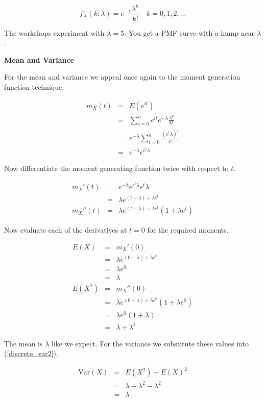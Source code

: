 \documentclass[]{article}
\begin{document}
\begin{equation} \label{poisson_pmf}
f_X(k; \lambda) = e^{-\lambda} \frac{\lambda^k}{k!} 
\quad k = 0, 1, 2, \ldots
\end{equation}

The workshops experiment with $\lambda = 5$.  You get a
PMF curve with a hump near $\lambda$.

\textbf{Mean and Variance}

For the mean and variance we appeal once again to the
moment generation function technique.

\begin{eqnarray*}
m_X(t) & = & E(e^{it}) \\
   & = & \sum_{i=0}^n e^{it} e^{-\lambda} \frac{\lambda^k}{k!} \\
   & = & e^{-\lambda} \sum_{i=0}^n \frac{(e^t \lambda)^i}{i!} \\
   & = & e^{-\lambda} e^{e^t \lambda}
\end{eqnarray*}

Now differentiate the moment generating function twice with
respect to $t$.

\begin{eqnarray*}
m_X'(t) & = & e^{-\lambda} e^{e^t \lambda} e^t \lambda \\
        & = & \lambda e^{(t-\lambda) + \lambda e^t} \\
m_X''(t) & = & \lambda e^{(t-\lambda) + \lambda e^t}(1+\lambda e^t)\end{eqnarray*}

Now evaluate each of the derivatives at $t=0$ for the
required moments.

\begin{eqnarray*}
E(X) & = & m_X'(0) \\
   & = & \lambda e^{(0-\lambda) + \lambda e^0} \\
   & = & \lambda e^0 \\
   & = & \lambda \label{poisson_mean} \\
E(X^2) & = & m_X''(0) \\
   & = & \lambda e^{(0-\lambda) + \lambda e^0}(1+\lambda e^0) \\
   & = & \lambda e^0(1+\lambda) \\
   & = & \lambda + \lambda^2
\end{eqnarray*}

The mean is $\lambda$ like we expect.  For the variance we
substitute these values into (\ref{discrete_var2}).

\begin{eqnarray}
\mbox{Var}(X) & = & E(X^2) - E(X)^2 \nonumber \\
   & = & \lambda + \lambda^2 - \lambda^2 \nonumber \\
   & = & \lambda \label{poisson_var}
\end{eqnarray}
\end{document}
